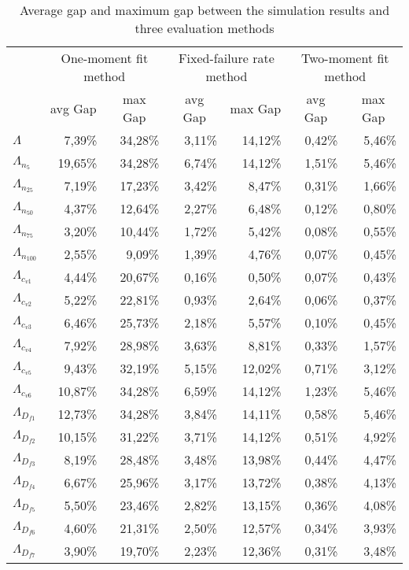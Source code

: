 \documentclass[preprint,12pt]{elsarticle}
\begin{document}
\begin{table}[htbp]
  \centering
    \caption{Average gap and maximum gap between the simulation results and three evaluation methods}
    \begin{tabular}{lrrrrrr}
    \toprule
    & \multicolumn{2}{c}{One-moment fit method} & \multicolumn{2}{c}{Fixed-failure rate method} & \multicolumn{2}{c}{Two-moment fit method}  \\
    & \multicolumn{1}{c}{avg Gap} & \multicolumn{1}{c}{max Gap} & \multicolumn{1}{c}{avg Gap} & \multicolumn{1}{c}{max Gap} & \multicolumn{1}{c}{avg Gap} & \multicolumn{1}{c}{max Gap} \\
    \midrule
    $\Lambda$ & 7,39\% & 34,28\% & 3,11\% & 14,12\% & 0,42\% & 5,46\% \\
    $\Lambda_{n_{5}}$ & 19,65\% & 34,28\% & 6,74\% & 14,12\% & 1,51\% & 5,46\% \\
    $\Lambda_{n_{25}}$ & 7,19\% & 17,23\% & 3,42\% & 8,47\% & 0,31\% & 1,66\% \\
    $\Lambda_{n_{50}}$ & 4,37\% & 12,64\% & 2,27\% & 6,48\% & 0,12\% & 0,80\% \\
    $\Lambda_{n_{75}}$ & 3,20\% & 10,44\% & 1,72\% & 5,42\% & 0,08\% & 0,55\% \\
    $\Lambda_{n_{100}}$ & 2,55\% & 9,09\% & 1,39\% & 4,76\% & 0,07\% & 0,45\% \\
    $\Lambda_{c_{v1}}$ & 4,44\% & 20,67\% & 0,16\% & 0,50\% & 0,07\% & 0,43\% \\
    $\Lambda_{c_{v2}}$ & 5,22\% & 22,81\% & 0,93\% & 2,64\% & 0,06\% & 0,37\% \\
    $\Lambda_{c_{v3}}$ & 6,46\% & 25,73\% & 2,18\% & 5,57\% & 0,10\% & 0,45\% \\
    $\Lambda_{c_{v4}}$ & 7,92\% & 28,98\% & 3,63\% & 8,81\% & 0,33\% & 1,57\% \\
    $\Lambda_{c_{v5}}$ & 9,43\% & 32,19\% & 5,15\% & 12,02\% & 0,71\% & 3,12\% \\
    $\Lambda_{c_{v6}}$ & 10,87\% & 34,28\% & 6,59\% & 14,12\% & 1,23\% & 5,46\% \\
    $\Lambda_{D_{f1}}$  & 12,73\% & 34,28\% & 3,84\% & 14,11\% & 0,58\% & 5,46\% \\
    $\Lambda_{D_{f2}}$  & 10,15\% & 31,22\% & 3,71\% & 14,12\% & 0,51\% & 4,92\% \\
    $\Lambda_{D_{f3}}$  & 8,19\% & 28,48\% & 3,48\% & 13,98\% & 0,44\% & 4,47\% \\
    $\Lambda_{D_{f4}}$  & 6,67\% & 25,96\% & 3,17\% & 13,72\% & 0,38\% & 4,13\% \\
    $\Lambda_{D_{f5}}$  & 5,50\% & 23,46\% & 2,82\% & 13,15\% & 0,36\% & 4,08\% \\
    $\Lambda_{D_{f6}}$ & 4,60\% & 21,31\% & 2,50\% & 12,57\% & 0,34\% & 3,93\% \\
    $\Lambda_{D_{f7}}$  & 3,90\% & 19,70\% & 2,23\% & 12,36\% & 0,31\% & 3,48\% \\
    \bottomrule
    \end{tabular}%
  \label{tab:addlabel}%
\end{table}%
\end{document}
